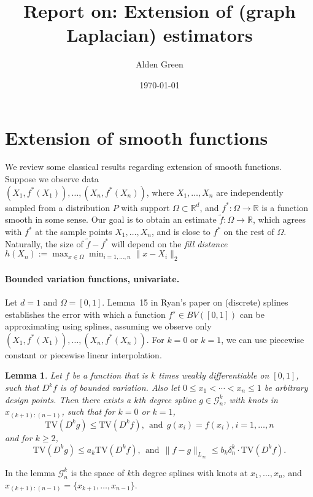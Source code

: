 \documentclass{article}
\newcommand{\Reals}{\mathbb{R}}
\newcommand{\1}{\mathbf{1}}
\newcommand{\Rd}{\Reals^d}
\newcommand{\Leb}{L}
\newcommand{\mc}[1]{\mathcal{#1}}
\newcommand{\wt}[1]{\widetilde{#1}}
\newtheorem{lemma}{Lemma}
\theoremstyle{definition}
\theoremstyle{remark}
\begin{document}
\title{Report on: Extension of (graph Laplacian) estimators}
\author{Alden Green}
\date{\today}
\maketitle

\section{Extension of smooth functions}

We review some classical results regarding extension of smooth functions. Suppose we observe data\\ $(X_1,f^{\ast}(X_1)), \ldots, (X_n,f^{\ast}(X_n))$, where $X_1,\ldots,X_n$ are independently sampled from a distribution $P$ with support $\Omega \subset \Rd$, and $f^{\ast}: \Omega \to \Reals$ is a function smooth in some sense. Our goal is to obtain an estimate $\wt{f}: \Omega \to \Reals$, which agrees with $f^{\ast}$ at the sample points $X_1,\ldots,X_n$, and is close to $f^{\ast}$ on the rest of $\Omega$. Naturally, the size of $\wt{f} - f^{\ast}$ will depend on the \emph{fill distance} $h(X_n) := \max_{x \in \Omega} \min_{i = 1,\ldots,n} \|x - X_i\|_2$

\paragraph{Bounded variation functions, univariate.} Let $d = 1$ and $\Omega = [0,1]$. Lemma~15 in Ryan's paper on (discrete) splines establishes the error with which a function $f^{\star} \in BV([0,1])$ can be approximating using splines, assuming we observe only $(X_1,f^{\ast}(X_1)), \ldots, (X_n,f^{\ast}(X_n))$. For $k = 0$ or $k = 1$, we can use piecewise constant or piecewise linear interpolation.

\begin{lemma}
	Let $f$ be a function that is $k$ times weakly differentiable on $[0,1]$, such that $D^k f$ is of bounded variation. Also let $0 \leq x_1 < \cdots < x_n \leq 1$ be arbitrary design points. Then there exists a $k$th degree spline $g \in \mc{G}_n^k$, with knots in $x_{(k + 1):(n - 1)}$, such that for $k = 0$ or $k = 1$,
	\begin{equation*}
	\mathrm{TV}(D^k g) \leq \mathrm{TV}(D^k f),~~\textrm{and}~~ g(x_i) = f(x_i), i = 1,\ldots,n
	\end{equation*}
	and for $k \geq 2$,
	\begin{equation*}
	\mathrm{TV}(D^kg) \leq a_k \mathrm{TV}(D^k f),~~\textrm{and}~~ \|f - g\|_{\Leb_{\infty}} \leq b_k \delta_n^k \cdot \mathrm{TV}(D^k f).
	\end{equation*}
\end{lemma}
In the lemma $\mc{G}_n^k$ is the space of $k$th degree splines with knots at $x_1,\ldots,x_n$, and $x_{(k + 1):(n - 1)} = \{x_{k + 1},\ldots, x_{n - 1}\}$. 
\end{document}
